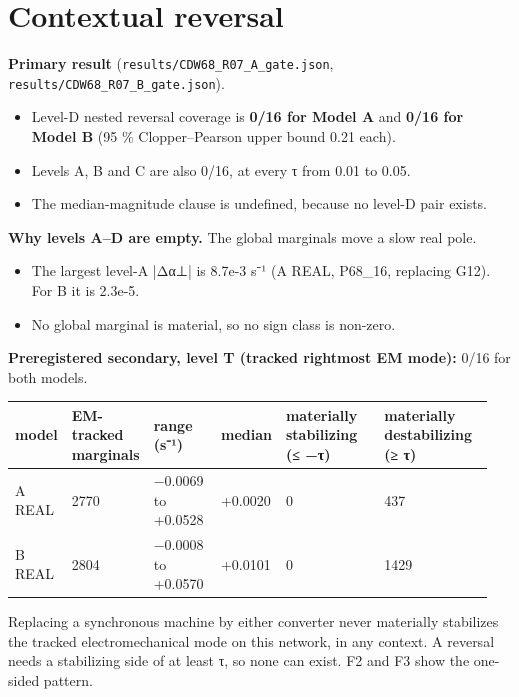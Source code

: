 \documentclass[10pt,a4paper]{article}
\begin{document}
\section{Contextual reversal}
\textbf{Primary result} (\texttt{results/\allowbreak{}CDW68\_\allowbreak{}R07\_\allowbreak{}A\_\allowbreak{}gate.json}, \texttt{results/\allowbreak{}CDW68\_\allowbreak{}R07\_\allowbreak{}B\_\allowbreak{}gate.json}).

\begin{itemize}
\item Level-D nested reversal coverage is \textbf{0/16 for Model A} and \textbf{0/16 for Model B} (95 \% Clopper–Pearson upper bound 0.21 each).
\item Levels A, B and C are also 0/16, at every τ from 0.01 to 0.05.
\item The median-magnitude clause is undefined, because no level-D pair exists.
\end{itemize}
\textbf{Why levels A–D are empty.} The global marginals move a slow real pole.

\begin{itemize}
\item The largest level-A |Δα⊥| is 8.7e-3 s⁻¹ (A REAL, P68\_16, replacing G12). For B it is 2.3e-5.
\item No global marginal is material, so no sign class is non-zero.
\end{itemize}
\textbf{Preregistered secondary, level T (tracked rightmost EM mode):} 0/16 for both models.

{\small
\begin{longtable}{L{0.060\linewidth}L{0.171\linewidth}L{0.154\linewidth}L{0.060\linewidth}L{0.248\linewidth}L{0.256\linewidth}}
\toprule
\textbf{model} & \textbf{EM-tracked marginals} & \textbf{range (s⁻¹)} & \textbf{median} & \textbf{materially stabilizing (≤ −τ)} & \textbf{materially destabilizing (≥ τ)} \\
\midrule
\endhead
A REAL & 2770 & −0.0069 to +0.0528 & +0.0020 & 0 & 437 \\
B REAL & 2804 & −0.0008 to +0.0570 & +0.0101 & 0 & 1429 \\
\bottomrule
\end{longtable}}
Replacing a synchronous machine by either converter never materially stabilizes the tracked electromechanical mode on this network, in any context. A reversal needs a stabilizing side of at least τ, so none can exist. F2 and F3 show the one-sided pattern.
\end{document}
